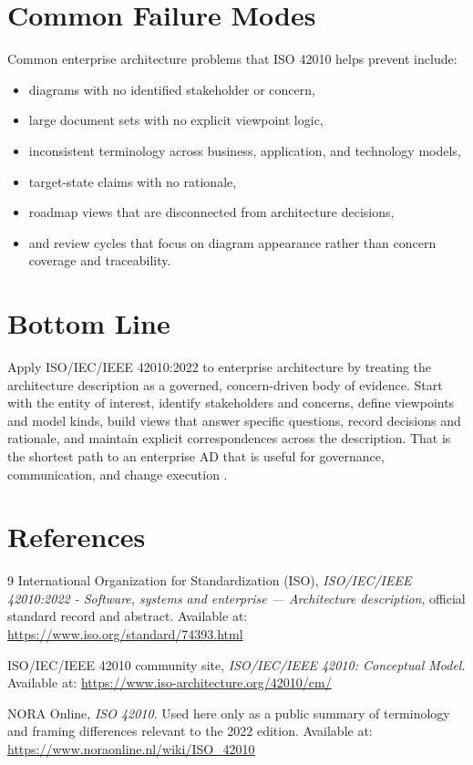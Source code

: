 \documentclass[11pt]{article}
\begin{document}
\section*{Common Failure Modes}
Common enterprise architecture problems that ISO 42010 helps prevent include:
\begin{itemize}
    \item diagrams with no identified stakeholder or concern,
    \item large document sets with no explicit viewpoint logic,
    \item inconsistent terminology across business, application, and technology models,
    \item target-state claims with no rationale,
    \item roadmap views that are disconnected from architecture decisions,
    \item and review cycles that focus on diagram appearance rather than concern coverage and traceability.
\end{itemize}

\section*{Bottom Line}
Apply ISO/IEC/IEEE 42010:2022 to enterprise architecture by treating the architecture description as a governed, concern-driven body of evidence. Start with the entity of interest, identify stakeholders and concerns, define viewpoints and model kinds, build views that answer specific questions, record decisions and rationale, and maintain explicit correspondences across the description. That is the shortest path to an enterprise AD that is useful for governance, communication, and change execution \cite{iso42010,cm42010}.

\section*{References}
\begin{thebibliography}{9}
International Organization for Standardization (ISO), \emph{ISO/IEC/IEEE 42010:2022 - Software, systems and enterprise --- Architecture description}, official standard record and abstract. Available at: \url{https://www.iso.org/standard/74393.html}

ISO/IEC/IEEE 42010 community site, \emph{ISO/IEC/IEEE 42010: Conceptual Model}. Available at: \url{https://www.iso-architecture.org/42010/cm/}

NORA Online, \emph{ISO 42010}. Used here only as a public summary of terminology and framing differences relevant to the 2022 edition. Available at: \url{https://www.noraonline.nl/wiki/ISO_42010}
\end{thebibliography}
\end{document}

